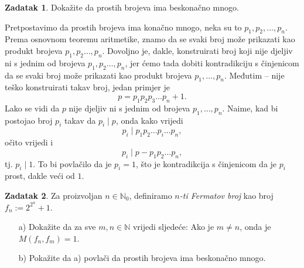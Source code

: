 \documentclass{book}
\renewenvironment{proof}{%
    \vspace{-\parskip}\begin{oldproof}%
    }{%
    \end{oldproof}%
}
\theoremstyle{definition}
\theoremstyle{definition}
\newtheorem{exercise}{Zadatak}
\theoremstyle{remark}
\begin{document}
\begin{exercise}
Dokažite da prostih brojeva ima beskonačno mnogo.
\end{exercise}
\begin{proof}[Rješenje]
Pretpostavimo da prostih brojeva ima konačno mnogo, neka su to $p_1, p_2, \dots, p_n$. Prema osnovnom teoremu aritmetike, znamo da se svaki broj može prikazati kao produkt brojeva $p_1, p_2\dots, p_n$. Dovoljno je, dakle, konstruirati broj koji nije djeljiv ni s jednim od brojeva $p_1, p_2\dots, p_n$, jer ćemo tada dobiti kontradikciju s činjenicom da se svaki broj može prikazati kao produkt brojeva $p_1, \dots, p_n$. Međutim -- nije teško konstruirati takav broj, jedan primjer je
$$p=p_1p_2p_3\dots p_n+1.$$
Lako se vidi da $p$ nije djeljiv ni s jednim od brojeva $p_1,\dots, p_n$. Naime, kad bi postojao broj $p_i$ takav da $p_i\; |\; p$, onda kako vrijedi $$p_i \; |\; p_1p_2\dots p_i\dots p_n,$$ očito vrijedi i $$p_i\; |\; p-p_1p_2\dots p_n,$$ tj. $p_i\; |\; 1$. To bi povlačilo da je $p_i=1$, što je kontradikcija s činjenicom da je $p_i$ prost, dakle veći od $1$.
\end{proof}
\begin{exercise}
Za proizvoljan $n\in \mathbb{N}_0$, definiramo \textit{$n$-ti Fermatov broj} kao broj $f_n:=2^{2^n}+1$.
\begin{itemize}
\item[a)] Dokažite da za sve $m, n\in \mathbb{N}$ vrijedi sljedeće: Ako je $m\neq n$, onda je $M(f_n, f_m)=1$.
\item[b)] Pokažite da a) povlači da prostih brojeva ima beskonačno mnogo.
\end{itemize}
\end{exercise}
\end{document}
